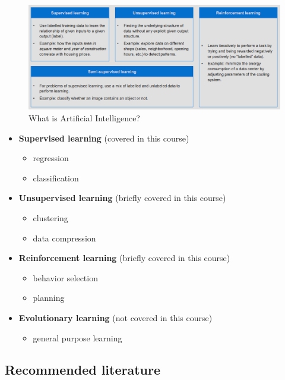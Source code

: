 \documentclass[12pt, a4paper, oneside, justified]{article}
\begin{document}
\begin{figure}[!h]
    \centering
    \includegraphics[scale=0.8]{../img/1-11.png}
    \caption{What is Artificial Intelligence?}
    \label{img/1-11}
\end{figure}

\vspace{2cm}
\begin{itemize}
    \item \textbf{Supervised learning} (covered in this course)
    \begin{itemize}
        \item regression
        \item classification
    \end{itemize}
    \item \textbf{Unsupervised learning} (briefly covered in this course)
    \begin{itemize}
        \item clustering
        \item data compression
    \end{itemize}
    \item \textbf{Reinforcement learning} (briefly covered in this course)
    \begin{itemize}
        \item behavior selection
        \item planning
    \end{itemize}
    \item \textbf{Evolutionary learning} (not covered in this course)
    \begin{itemize}
        \item general purpose learning
    \end{itemize}
\end{itemize}

\subsection{Recommended literature}
\end{document}
